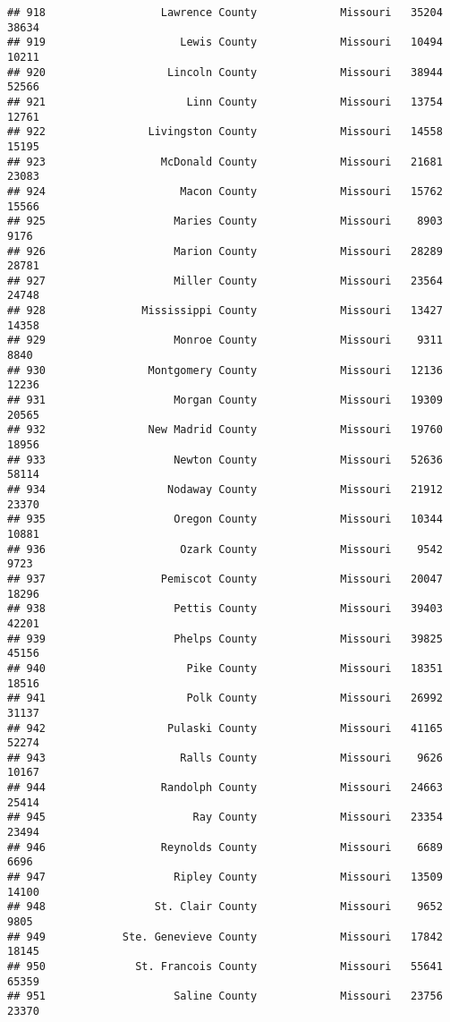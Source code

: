 \documentclass[
]{article}
\begin{document}
\begin{verbatim}
## 918                  Lawrence County             Missouri   35204   38634
## 919                     Lewis County             Missouri   10494   10211
## 920                   Lincoln County             Missouri   38944   52566
## 921                      Linn County             Missouri   13754   12761
## 922                Livingston County             Missouri   14558   15195
## 923                  McDonald County             Missouri   21681   23083
## 924                     Macon County             Missouri   15762   15566
## 925                    Maries County             Missouri    8903    9176
## 926                    Marion County             Missouri   28289   28781
## 927                    Miller County             Missouri   23564   24748
## 928               Mississippi County             Missouri   13427   14358
## 929                    Monroe County             Missouri    9311    8840
## 930                Montgomery County             Missouri   12136   12236
## 931                    Morgan County             Missouri   19309   20565
## 932                New Madrid County             Missouri   19760   18956
## 933                    Newton County             Missouri   52636   58114
## 934                   Nodaway County             Missouri   21912   23370
## 935                    Oregon County             Missouri   10344   10881
## 936                     Ozark County             Missouri    9542    9723
## 937                  Pemiscot County             Missouri   20047   18296
## 938                    Pettis County             Missouri   39403   42201
## 939                    Phelps County             Missouri   39825   45156
## 940                      Pike County             Missouri   18351   18516
## 941                      Polk County             Missouri   26992   31137
## 942                   Pulaski County             Missouri   41165   52274
## 943                     Ralls County             Missouri    9626   10167
## 944                  Randolph County             Missouri   24663   25414
## 945                       Ray County             Missouri   23354   23494
## 946                  Reynolds County             Missouri    6689    6696
## 947                    Ripley County             Missouri   13509   14100
## 948                 St. Clair County             Missouri    9652    9805
## 949            Ste. Genevieve County             Missouri   17842   18145
## 950              St. Francois County             Missouri   55641   65359
## 951                    Saline County             Missouri   23756   23370

\end{verbatim}
\end{document}
